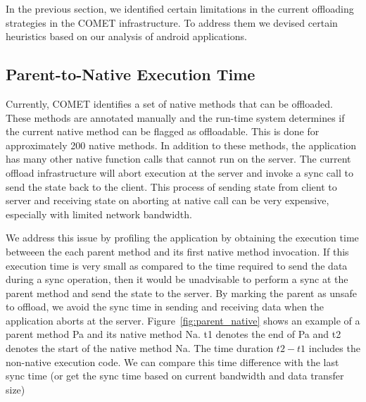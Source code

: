In the previous section, we identified certain limitations in the current offloading strategies
in the COMET infrastructure. To address them we devised certain heuristics based on our analysis
of android applications.

\subsection{Parent-to-Native Execution Time}
Currently, COMET identifies a set of native methods that can be offloaded. These methods are annotated manually
and the run-time system determines if the current native method can be flagged as offloadable. This is done for
approximately 200 native methods. In addition to these methods, the application has many other native function calls
that cannot run on the server. The current offload infrastructure will abort execution at the server and invoke a sync
call to send the state back to the client. This process of sending state from client to server and receiving state on
aborting at native call can be very expensive, especially with limited network bandwidth.

We address this issue by profiling the application by obtaining the execution time betweeen the each parent method and its
first native method invocation. If this execution time is very small as compared to the time required to send the data during
a sync operation, then it would be unadvisable to perform a sync at the parent method and send the state to the server. By marking the parent as
unsafe to offload, we avoid the sync time in sending and receiving data when the application aborts at the server.
Figure~\ref{fig:parent_native} shows an example of a parent method Pa and its native method Na. t1 denotes the end of Pa and t2
denotes the start of the native method Na. The time duration $t2-t1$ includes the non-native execution code. We can compare this
time difference with the last sync time (or get the sync time based on current bandwidth and data transfer size)

